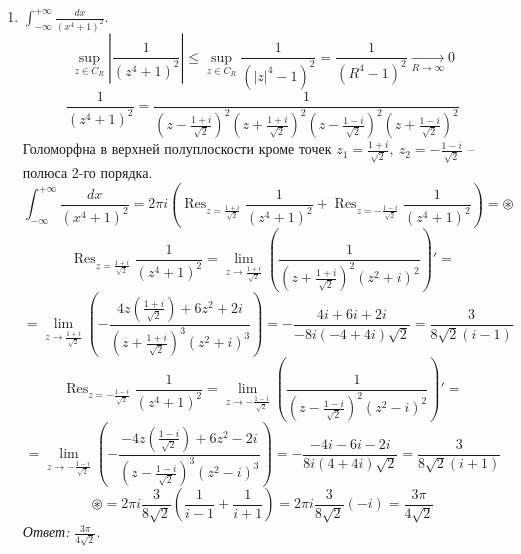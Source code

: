 \documentclass[14pt, a4paper, titlepage, fleqn]{extarticle}
\DeclareMathOperator*{\res}{Res}
\begin{document}
\begin{enumerate}
            \item \( \int_{-\infty}^{+\infty} \frac{dx}{(x^4+1)^2} \).
            \[
                \sup_{z\in C_R} \left| \frac{1}{(z^4+1)^2} \right| \leq \sup_{z\in C_R} \frac{1}{(|z|^4-1)^2} = \frac{1}{(R^4 - 1)^2} \xrightarrow[R \to \infty]{} 0
            \]
            \[
                \frac{1}{(z^4+1)^2} = \frac{1}{\left(z-\frac{1+i}{\sqrt{2}} \right)^2 \left(z+\frac{1+i}{\sqrt{2}}\right)^2 \left(z-\frac{1-i}{\sqrt{2}}\right)^2 \left(z+\frac{1-i}{\sqrt{2}}\right)^2}
            \]
            Голоморфна в верхней полуплоскости кроме точек \( z_1 = \frac{1+i}{\sqrt{2}}, ~ z_2= -\frac{1-i}{\sqrt{2}}\) -- полюса 2-го порядка.
            \[
                \int_{-\infty}^{+\infty} \frac{dx}{(x^4+1)^2} = 2\pi i \left( \res_{z = \frac{1+i}{\sqrt{2}}} \frac{1}{(z^4+1)^2} + \res_{z = -\frac{1-i}{\sqrt{2}}} \frac{1}{(z^4+1)^2} \right) = \circledast
            \]
            \[
                \res_{z = \frac{1+i}{\sqrt{2}}} \frac{1}{(z^4+1)^2} = \lim_{z\to\frac{1+i}{\sqrt{2}}} \left( \frac{1}{\left( z + \frac{1+i}{\sqrt{2}} \right)^2 \left(z^2 + i \right)^2} \right)' = 
            \]
            \[
                = \lim_{z\to\frac{1+i}{\sqrt{2}}} \left( -\frac{4z\left( \frac{1+i}{\sqrt{2}} \right) + 6z^2 +2i}{\left( z + \frac{1+i}{\sqrt{2}} \right)^3 \left(z^2 + i \right)^3} \right) = -\frac{4i + 6i + 2i}{-8i (-4+4i)\sqrt{2}} = \frac{3}{8\sqrt{2} (i-1)}
            \]
            \[
                \res_{z = -\frac{1-i}{\sqrt{2}}} \frac{1}{(z^4+1)^2} = \lim_{z\to-\frac{1-i}{\sqrt{2}}} \left( \frac{1}{\left( z - \frac{1-i}{\sqrt{2}} \right)^2 \left(z^2 - i \right)^2} \right)' = 
            \]
            \[
                = \lim_{z\to-\frac{1-i}{\sqrt{2}}} \left( -\frac{-4z\left( \frac{1-i}{\sqrt{2}} \right) + 6z^2 -2i}{\left( z - \frac{1-i}{\sqrt{2}} \right)^3 \left(z^2 - i \right)^3} \right) = -\frac{-4i - 6i - 2i}{8i (4+4i)\sqrt{2}} = \frac{3}{8\sqrt{2} (i+1)}
            \]
            \[
                \circledast = 2\pi i \frac{3}{8\sqrt{2}} \left( \frac{1}{i-1} + \frac{1}{i+1} \right) = 2\pi i \frac{3}{8\sqrt{2}} (-i) = \frac{3\pi}{4\sqrt{2}} 
            \]
            \textit{Ответ:} \( \frac{3\pi}{4\sqrt{2}} \).


\end{enumerate}
\end{document}
